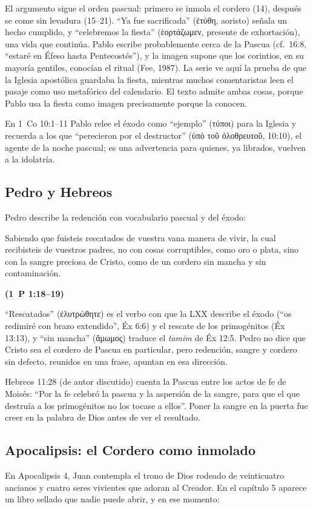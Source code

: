 \documentclass[11pt,letterpaper]{article}
\newcommand{\grc}[1]{\foreignlanguage{ancientgreek}{#1}}
\newcommand{\fuente}[1]{\par\hfill{\upshape\bfseries\small\textcolor{tierraroja}{#1}}}
\begin{document}
El argumento sigue el orden pascual: primero se inmola el cordero (14), después se come sin levadura (15--21). ``Ya fue sacrificada'' (\grc{ἐτύθη}, aoristo) señala un hecho cumplido, y ``celebremos la fiesta'' (\grc{ἑορτάζωμεν}, presente de exhortación), una vida que continúa. Pablo escribe probablemente cerca de la Pascua (cf.\ 16:8, ``estaré en Éfeso hasta Pentecostés''), y la imagen supone que los corintios, en su mayoría gentiles, conocían el ritual (Fee, 1987). La serie ve aquí la prueba de que la Iglesia apostólica guardaba la fiesta, mientras muchos comentaristas leen el pasaje como uso metafórico del calendario. El texto admite ambas cosas, porque Pablo usa la fiesta como imagen precisamente porque la conocen.

En 1~Co 10:1--11 Pablo relee el éxodo como ``ejemplo'' (\grc{τύποι}) para la Iglesia y recuerda a los que ``perecieron por el destructor'' (\grc{ὑπὸ τοῦ ὀλοθρευτοῦ}, 10:10), el agente de la noche pascual; es una advertencia para quienes, ya librados, vuelven a la idolatría.

\subsection{Pedro y Hebreos}
Pedro describe la redención con vocabulario pascual y del éxodo:

\begin{cita}Sabiendo que fuisteis rescatados de vuestra vana manera de vivir, la cual recibisteis de vuestros padres, no con cosas corruptibles, como oro o plata, sino con la sangre preciosa de Cristo, como de un cordero sin mancha y sin contaminación.\fuente{(1~P 1:18--19)}\end{cita}

``Rescatados'' (\grc{ἐλυτρώθητε}) es el verbo con que la LXX describe el éxodo (``os redimiré con brazo extendido'', Éx 6:6) y el rescate de los primogénitos (Éx 13:13), y ``sin mancha'' (\grc{ἄμωμος}) traduce el \emph{tamim} de Éx 12:5. Pedro no dice que Cristo sea el cordero de Pascua en particular, pero redención, sangre y cordero sin defecto, reunidos en una frase, apuntan en esa dirección.

Hebreos 11:28 (de autor discutido) cuenta la Pascua entre los actos de fe de Moisés: ``Por la fe celebró la pascua y la aspersión de la sangre, para que el que destruía a los primogénitos no los tocase a ellos''. Poner la sangre en la puerta fue creer en la palabra de Dios antes de ver el resultado.

\subsection{Apocalipsis: el Cordero como inmolado}
En Apocalipsis 4, Juan contempla el trono de Dios rodeado de veinticuatro ancianos y cuatro seres vivientes que adoran al Creador. En el capítulo 5 aparece un libro sellado que nadie puede abrir, y en ese momento:
\end{document}
